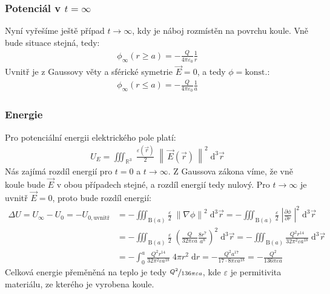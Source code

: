 \documentclass[10pt,a4paper]{article}
\newcommand{\const}[1]{\text{#1}}
\newcommand{\norm}[1]{\left\lVert#1\right\rVert}
\renewcommand{\d}[1]{\;\const{d}#1}
\newcommand{\pd}[2]{\frac{\partial  #1}{\partial  #2} \;}
\newcommand{\mathalt}[2]{
    \texorpdfstring{#2}{#1}
}
\begin{document}
\subsubsection*{Potenciál v \mathalt{t=∞}{$t=\infty$}}
Nyní vyřešíme ještě případ $t\to\infty$, kdy je náboj rozmístěn na povrchu koule. Vně bude situace stejná, tedy:
\begin{gather*}
    \phi_\infty(r \geq a) = -\frac{Q}{4\pi\varepsilon_0} \frac{1}{r}
\end{gather*}
Uvnitř je z Gaussovy věty a sférické symetrie $\vec{E} = 0$, a tedy $\phi = \const{konst.}$:
\begin{gather*}
    \phi_\infty(r \leq a) = -\frac{Q}{4\pi\varepsilon_0} \frac{1}{a}
\end{gather*}

\subsubsection*{Energie}
Pro potenciální energii elektrického pole platí:
\begin{align*}
    U_E = \iiint_{\mathbb{R}^3} \; \frac{\varepsilon(\vec{r})}{2} \; \norm{\,\vec{E}(\vec{r})\,}^2 \d{^3 \vec{r}}
\end{align*}
Nás zajímá rozdíl energií pro $t=0$ a $t\to\infty$. Z Gaussova zákona víme, že vně koule bude $\vec{E}$ v obou případech stejné, a rozdíl energií tedy nulový. Pro $t\to\infty$ je uvnitř $\vec{E}=0$, proto bude rozdíl energií:
\begin{align*}
    \Delta U
    = U_\infty - U_0 = -U_{0, \text{uvnitř}}
    &= - \iiint_{\const{B}(a)} \frac{\varepsilon}{2} \; \norm{\nabla \phi}^2 \d{^3 \vec{r}}
    = - \iiint_{\const{B}(a)} \frac{\varepsilon}{2} \; \left|\pd{\phi}{r}\!\right|^2 \d{^3 \vec{r}}
    \\[5pt]
    &= - \iiint_{\const{B}(a)} \frac{\varepsilon}{2} \; \left(\frac{Q}{32\pi\varepsilon a} \frac{8r^7}{a^8}\right)^2 \d{^3 \vec{r}}
    = - \iiint_{\const{B}(a)} \frac{Q^2 r^{14}}{32 \pi^2 \varepsilon a^{18}} \d{^3 \vec{r}}
    \\[5pt]
    &= - \int_0^a \frac{Q^2 r^{14}}{32 \pi^2 \varepsilon a^{18}} \; 4\pi r^2 \d{r}
    = - \frac{Q^2 a^{17}}{17 \cdot 8 \pi \varepsilon a^{18}}
    = - \frac{Q^2}{136 \pi \varepsilon a}
\end{align*}
Celková energie přeměněná na teplo je tedy $\nicefrac{Q^2}{136 \pi \varepsilon a}$, kde $\varepsilon$ je permitivita materiálu, ze kterého je vyrobena koule.
\end{document}
